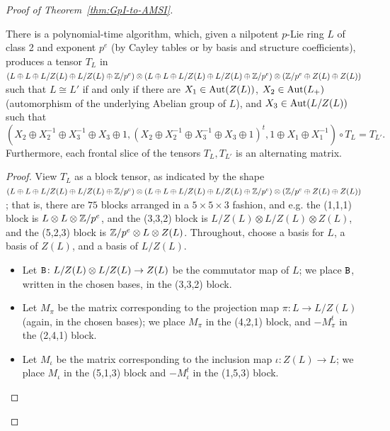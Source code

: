 \begin{proof}[Proof of Theorem~\ref{thm:GpI-to-AMSI}]
\begin{lemma} \label{lem:Lie-ring-to-TI}
There is a polynomial-time algorithm, which, given a nilpotent $p$-Lie ring $L$ of class 2 and exponent $p^e$ (by Cayley tables or by basis and structure coefficients), produces a tensor $T_L$ in $(L \oplus L \oplus L/Z(L) \oplus L/Z(L) \oplus \mathbb{Z}/p^e) \otimes (L \oplus L \oplus L/Z(L) \oplus L/Z(L) \oplus \mathbb{Z}/p^e)  \otimes (\mathbb{Z}/p^e \oplus Z(L) \oplus Z(L))$ such that $L \cong L'$ if and only if there are $X_1 \in \mathrm{Aut}(Z(L))$, $X_2 \in \mathrm{Aut}(L_+)$ (automorphism of the underlying Abelian group of $L$), and $X_3 \in \mathrm{Aut}(L/Z(L))$ such that
\begin{equation} \label{eqn:Lie-ring-to-TI}
(X_2 \oplus X_2^{-1} \oplus X_3^{-1} \oplus X_3 \oplus 1, (X_2 \oplus X_2^{-1} \oplus X_3^{-1} \oplus X_3 \oplus 1)^t, 1 \oplus X_1 \oplus X_1^{-1}) \circ T_L = T_{L'}.
\end{equation}
Furthermore, each frontal slice of the tensors $T_L, T_{L'}$ is an alternating matrix.
\end{lemma}

\begin{proof}
View $T_L$ as a block tensor, as indicated by the shape $(L \oplus L \oplus L/Z(L) \oplus L/Z(L) \oplus \mathbb{Z}/p^e) \otimes (L \oplus L \oplus L/Z(L) \oplus L/Z(L) \oplus \mathbb{Z}/p^e)  \otimes (\mathbb{Z}/p^e \oplus Z(L) \oplus Z(L))$; that is, there are $75$ blocks arranged in a $5 \times 5 \times 3$ fashion, and e.g. the (1,1,1) block is $L \otimes L \otimes \mathbb{Z}/p^e$, and the (3,3,2) block is $L/Z(L) \otimes L/Z(L) \otimes Z(L)$, and the (5,2,3) block is $\mathbb{Z}/p^e \otimes L \otimes Z(L)$. Throughout, choose a basis for $L$, a basis of $Z(L)$, and a basis of $L/Z(L)$. 
\begin{itemize}
\item Let $\mathtt{B} \colon L / Z(L) \otimes L / Z(L) \to Z(L)$ be the commutator map of $L$; we place $\mathtt{B}$, written in the chosen bases, in the (3,3,2) block. 

\item Let $M_\pi$ be the matrix corresponding to the projection map $\pi \colon L \to L/Z(L)$ (again, in the chosen bases); we place $M_{\pi}$ in the (4,2,1) block, and $-M_{\pi}^t$ in the (2,4,1) block. 

\item Let $M_{\iota}$ be the matrix corresponding to the inclusion map $\iota \colon Z(L) \to L$; we place $M_{\iota}$ in the (5,1,3) block and $-M_{\iota}^t$ in the (1,5,3) block.
\end{itemize}


\end{proof}
\end{proof}
